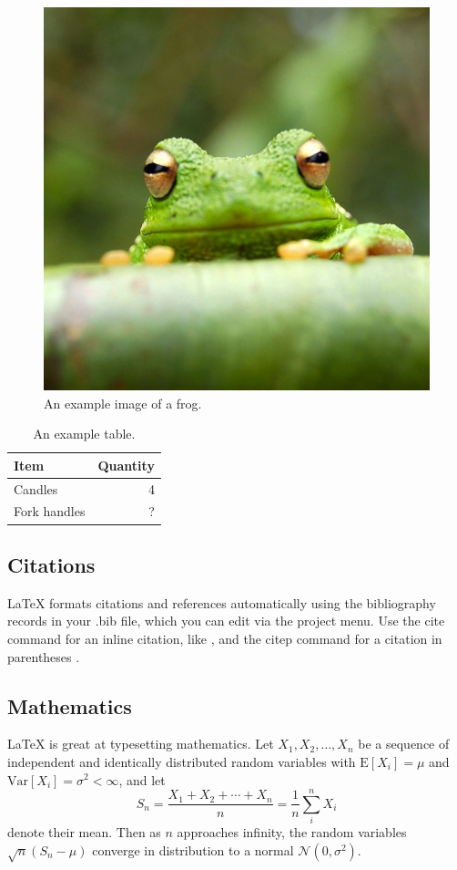 \documentclass[fleqn,10pt]{olplainarticle}
\theoremstyle{definition}
\theoremstyle{remark}
\begin{document}
\begin{figure}[ht]
\centering
\includegraphics[width=0.7\linewidth]{frog}
\caption{An example image of a frog.}
\label{fig:view}
\end{figure}

\begin{table}[ht]
\centering
\begin{tabular}{l|r}
Item & Quantity \\\hline
Candles & 4 \\
Fork handles & ?  
\end{tabular}
\caption{\label{tab:widgets}An example table.}
\end{table}

\subsection*{Citations}

LaTeX formats citations and references automatically using the bibliography records in your .bib file, which you can edit via the project menu. Use the cite command for an inline citation, like \cite{lees2010theoretical}, and the citep command for a citation in parentheses \citep{lees2010theoretical}.

\subsection*{Mathematics}

\LaTeX{} is great at typesetting mathematics. Let $X_1, X_2, \ldots, X_n$ be a sequence of independent and identically distributed random variables with $\text{E}[X_i] = \mu$ and $\text{Var}[X_i] = \sigma^2 < \infty$, and let
$$S_n = \frac{X_1 + X_2 + \cdots + X_n}{n}
      = \frac{1}{n}\sum_{i}^{n} X_i$$
denote their mean. Then as $n$ approaches infinity, the random variables $\sqrt{n}(S_n - \mu)$ converge in distribution to a normal $\mathcal{N}(0, \sigma^2)$.
\end{document}
